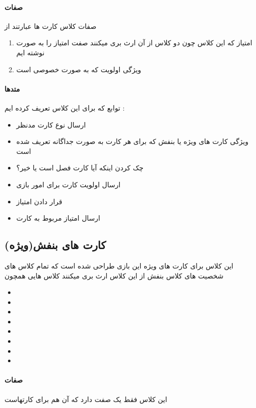 \documentclass[pdf,titlepage,a4paper]{report}
\begin{document}
	\paragraph{صفات}
	صفات کلاس کارت ها  عبارتند از 
	\begin{enumerate}
		\item امتیاز که این کلاس چون دو کلاس از آن ارث بری میکنند صفت امتیاز را به صورت   نوشته ایم
		\item  ویژگی اولویت که به صورت خصوصی است
	\end{enumerate}

	\paragraph{متدها}
	توابع که برای این کلاس تعریف کرده ایم :

	\begin{itemize}
		\item {} ارسال نوع کارت مدنظر
		\item {} ویژگی کارت های ویژه یا بنفش که برای هر کارت به صورت جداگانه تعریف شده است
		\item {} چک کردن اینکه آیا کارت فصل است یا خیر؟
		\item {} ارسال اولویت کارت برای امور بازی 
		\item {}  قرار دادن امتیاز
		\item {} ارسال امتیاز مربوط به کارت
	\end{itemize}
	
	
	\subsection{کارت های بنفش(ویژه)}
	این کلاس برای کارت های ویژه این بازی طراحی شده است که تمام کلاس های شخصیت های کلاس بنفش از این کلاس ارث بری میکنند
	کلاس هایی همچون 
	\begin{itemize}
		\item {}
		\item {}
		\item {}
		\item {}
		\item {}
		\item {}
		\item {}
		\item {}  
	\end{itemize}
	\paragraph{صفات}
	این کلاس فقط یک صفت دارد که آن هم برای   کارتهاست
\end{document}
